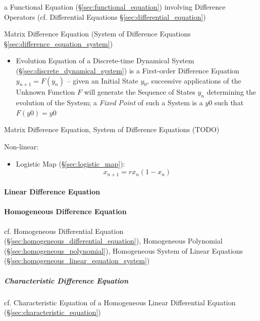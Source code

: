 {a Functional Equation (\S\ref{sec:functional_equation}) involving Difference
Operators (cf. Differential Equations \S\ref{sec:differential_equation})

\fist Matrix Difference Equation (System of Difference Equations
\S\ref{sec:difference_equation_system})

\begin{itemize}
  \item Evolution Equation of a Discrete-time Dynamical System
    (\S\ref{sec:discrete_dynamical_system}) is a First-order Difference Equation
    $y_{n+1} = F(y_n)$ -- given an Initial State $y_0$, successive applications
    of the Unknown Function $F$ will generate the Sequence of States $y_n$
    determining the evolution of the System; a \emph{Fixed Point} of such a
    System is a $y0$ such that $F(y0) = y0$
\end{itemize}

Matrix Difference Equation, System of Difference Equations (TODO)

Non-linear:
\begin{itemize}
  \item Logistic Map (\S\ref{sec:logistic_map}):\[
    x_{n+1} = rx_n(1-x_n)
  \]
\end{itemize}



\paragraph{Linear Difference Equation}\label{sec:linear_difference_equation}
\hfill

\paragraph{Homogeneous Difference Equation}
\label{sec:homogeneous_difference_equation}
\hfill

cf. Homogeneous Differential Equation
(\S\ref{sec:homogeneous_differential_equation}), Homogeneous Polynomial
(\S\ref{sec:homogeneous_polynomial}), Homogeneous System of Linear Equations
(\S\ref{sec:homogeneous_linear_equation_system})



\subparagraph{Characteristic Difference Equation}
\label{sec:characteristic_difference_equation}\hfill

cf. Characteristic Equation of a Homogeneous Linear Differential Equation
(\S\ref{sec:characteristic_equation})



}
